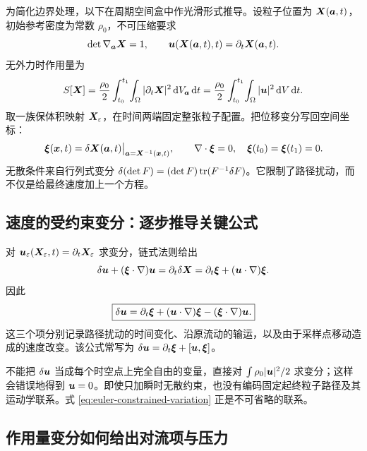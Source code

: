 为简化边界处理，以下在周期空间盒中作光滑形式推导。设粒子位置为 $\bm{X}(\bm{a},t)$，初始参考密度为常数 $\rho_0$，不可压缩要求
\begin{equation}
 \det\nabla_{\bm{a}}\bm{X}=1,\qquad
 \bm{u}(\bm{X}(\bm{a},t),t)=\partial_t\bm{X}(\bm{a},t).
\end{equation}
无外力时作用量为
\begin{equation}
 S[\bm{X}]=\frac{\rho_0}{2}\int_{t_0}^{t_1}\!\int_\Omega
 |\partial_t\bm{X}|^2\,\mathrm d V_{\bm{a}}\,\mathrm d t
 =\frac{\rho_0}{2}\int_{t_0}^{t_1}\!\int_\Omega|\bm{u}|^2\,\mathrm d V\,\mathrm d t.
\end{equation}
取一族保体积映射 $\bm{X}_\varepsilon$，在时间两端固定整张粒子配置。把位移变分写回空间坐标：
\begin{equation}
 \bm{\xi}(\bm{x},t)=\delta\bm{X}(\bm{a},t)
 \big|_{\bm{a}=\bm{X}^{-1}(\bm{x},t)},\qquad
 \nabla\cdot\bm{\xi}=0,\quad\bm{\xi}(t_0)=\bm{\xi}(t_1)=0.
\end{equation}
无散条件来自行列式变分 $\delta(\det F)=(\det F)\operatorname{tr}(F^{-1}\delta F)$。它限制了路径扰动，而不仅是给最终速度加上一个方程。

\subsection{速度的受约束变分：逐步推导关键公式}

对 $\bm{u}_\varepsilon(\bm{X}_\varepsilon,t)=\partial_t\bm{X}_\varepsilon$ 求变分，链式法则给出
\begin{equation}
 \delta\bm{u}+(\bm{\xi}\cdot\nabla)\bm{u}
 =\partial_t\delta\bm{X}
 =\partial_t\bm{\xi}+(\bm{u}\cdot\nabla)\bm{\xi}.
\end{equation}
因此
\begin{equation}
 \boxed{\delta\bm{u}=\partial_t\bm{\xi}
 +(\bm{u}\cdot\nabla)\bm{\xi}
 -(\bm{\xi}\cdot\nabla)\bm{u}.}\label{eq:euler-constrained-variation}
\end{equation}
这三个项分别记录路径扰动的时间变化、沿原流动的输运，以及由于采样点移动造成的速度改变。该公式常写为 $\delta\bm{u}=\partial_t\bm{\xi}+[\bm{u},\bm{\xi}]$。

\begin{warningbox}
不能把 $\delta\bm{u}$ 当成每个时空点上完全自由的变量，直接对 $\int\rho_0|\bm{u}|^2/2$ 求变分；这样会错误地得到 $\bm{u}=0$。即使只加瞬时无散约束，也没有编码固定起终粒子路径及其运动学联系。式 \eqref{eq:euler-constrained-variation} 正是不可省略的联系。
\end{warningbox}

\subsection{作用量变分如何给出对流项与压力}

